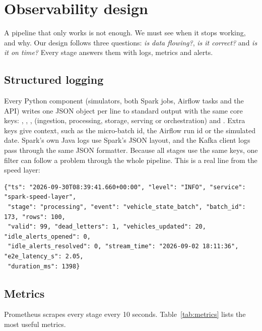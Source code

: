 \section{Observability design}
A pipeline that only works is not enough. We must see when it stops working, and why. Our design follows
three questions: \emph{is data flowing?}, \emph{is it correct?} and \emph{is it on time?} Every stage answers
them with logs, metrics and alerts.

\subsection{Structured logging}
Every Python component (simulators, both Spark jobs, Airflow tasks and the API) writes one JSON object per
line to standard output with the same core keys: , , , 
(ingestion, processing, storage, serving or orchestration) and . Extra keys give context, such as
the micro-batch id, the Airflow run id or the simulated date. Spark's own Java logs use Spark's JSON layout,
and the Kafka client logs pass through the same JSON formatter. Because all stages use the same keys, one
 filter can follow a problem through the whole pipeline. This is a real line from the speed layer:

\noindent\begin{minipage}{\linewidth}
\begin{Verbatim}[fontsize=\scriptsize,frame=single,framesep=2mm,rulecolor=\color{black!30}]
{"ts": "2026-09-30T08:39:41.660+00:00", "level": "INFO", "service": "spark-speed-layer",
 "stage": "processing", "event": "vehicle_state_batch", "batch_id": 173, "rows": 100,
 "valid": 99, "dead_letters": 1, "vehicles_updated": 20, "idle_alerts_opened": 0,
 "idle_alerts_resolved": 0, "stream_time": "2026-09-02 18:11:36", "e2e_latency_s": 2.05,
 "duration_ms": 1398}
\end{Verbatim}
\end{minipage}

\subsection{Metrics}
Prometheus scrapes every stage every 10 seconds. Table~\ref{tab:metrics} lists the most useful metrics.

